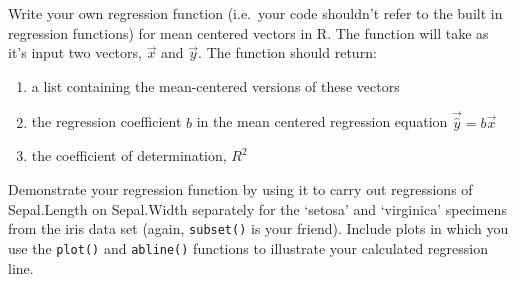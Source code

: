 \begin{assignment}
Write your own regression function (i.e.~your
code shouldn't refer to the built in regression functions) for mean
centered vectors in R. The function will take as it's input two vectors,
$\vec{x}$ and $\vec{y}$. The function should return:

\begin{enumerate}[1.]
\item
  a list containing the mean-centered versions of these vectors
\item
  the regression coefficient $b$ in the mean centered regression
  equation $\vec{\widehat{y}} = b\vec{x}$
\item
  the coefficient of determination, $R^2$
\end{enumerate}
Demonstrate your regression function by using it to carry out
regressions of Sepal.Length on Sepal.Width separately for the `setosa'
and `virginica' specimens from the iris data set (again,
\lstinline!subset()! is your friend). Include plots in which you use the
\lstinline!plot()! and \lstinline!abline()! functions to illustrate your
calculated regression line.

\end{assignment}

